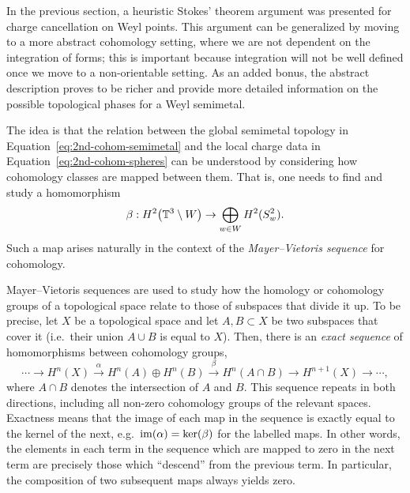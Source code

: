 In the previous section, a heuristic Stokes' theorem argument was presented for charge cancellation on Weyl points. This argument can be generalized by moving to a more abstract cohomology setting, where we are not dependent on the integration of forms; this is important because integration will not be well defined once we move to a non-orientable setting. As an added bonus, the abstract description proves to be richer and provide more detailed information on the possible topological phases for a Weyl semimetal.

The idea is that the relation between the global semimetal topology in Equation~\eqref{eq:2nd-cohom-semimetal} and the local charge data in Equation~\eqref{eq:2nd-cohom-spheres} can be understood by considering how cohomology classes are mapped between them. That is, one needs to find and study a homomorphism
\begin{equation*}
	\beta: H^2\big(\mathbb{T}^3\setminus W\big) \to \bigoplus_{w\in W} H^2(S_w^2).
\end{equation*}
Such a map arises naturally in the context of the \emph{Mayer--Vietoris sequence} for cohomology.

Mayer--Vietoris sequences are used to study how the homology or cohomology groups of a topological space relate to those of subspaces that divide it up. To be precise, let $X$ be a topological space and let $A,B\subset X$ be two subspaces that cover it (i.e.\ their union $A\cup B$ is equal to $X$). Then, there is an \emph{exact sequence} of homomorphisms between cohomology groups,
\begin{equation*}
	\cdots \to H^n(X) \overset{\alpha}{\to} H^n(A)\oplus H^n(B) \overset{\beta}{\to} H^n(A\cap B) \to H^{n+1}(X) \to \cdots,
\end{equation*}
where $A\cap B$ denotes the intersection of $A$ and $B$. This sequence repeats in both directions, including all non-zero cohomology groups of the relevant spaces. Exactness means that the image of each map in the sequence is exactly equal to the kernel of the next, e.g.\ $\operatorname{im}(\alpha)=\ker(\beta)$ for the labelled maps. In other words, the elements in each term in the sequence which are mapped to zero in the next term are precisely those which ``descend'' from the previous term. In particular, the composition of two subsequent maps always yields zero.

